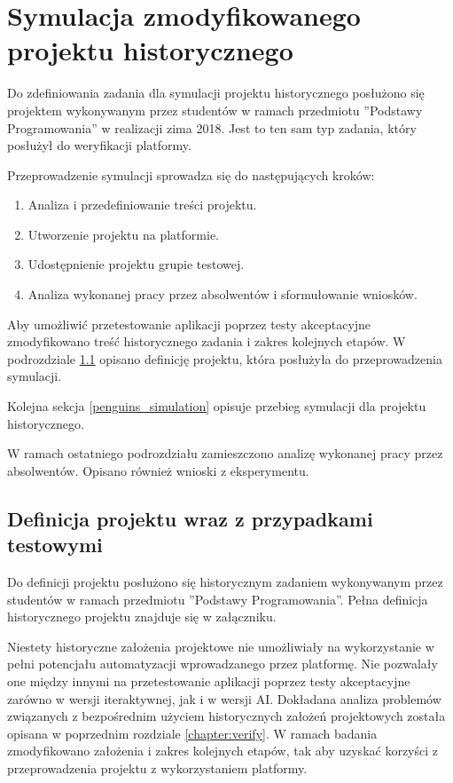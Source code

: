 \section{Symulacja zmodyfikowanego projektu historycznego}
\label{research_penguins}

Do zdefiniowania zadania dla symulacji projektu historycznego posłużono się projektem wykonywanym przez studentów w ramach przedmiotu ”Podstawy Programowania” w realizacji zima 2018.
Jest to ten sam typ zadania, który posłużył do weryfikacji platformy.

Przeprowadzenie symulacji sprowadza się do następujących kroków:
\begin{enumerate}
    \item Analiza i przedefiniowanie treści projektu.
    \item Utworzenie projektu na platformie.
    \item Udostępnienie projektu grupie testowej.
    \item Analiza wykonanej pracy przez absolwentów i sformułowanie wniosków.
\end{enumerate}

Aby umożliwić przetestowanie aplikacji poprzez testy akceptacyjne zmodyfikowano treść historycznego zadania i zakres kolejnych etapów.
W podrozdziale \ref{penguins_project_definition} opisano definicję projektu, która posłużyła do przeprowadzenia symulacji.

Kolejna sekcja \ref{penguins_simulation} opisuje przebieg symulacji dla projektu historycznego.

W ramach ostatniego podrozdziału zamieszczono analizę wykonanej pracy przez absolwentów.
Opisano również wnioski z eksperymentu.


\subsection{Definicja projektu wraz z przypadkami testowymi}
\label{penguins_project_definition}

Do definicji projektu posłużono się historycznym zadaniem wykonywanym przez studentów w ramach przedmiotu ”Podstawy Programowania”.
Pełna definicja historycznego projektu znajduje się w załączniku.

Niestety historyczne założenia projektowe nie umożliwiały na wykorzystanie w pełni potencjału automatyzacji wprowadzanego przez platformę.
Nie pozwalały one między innymi na przetestowanie aplikacji poprzez testy akceptacyjne zarówno w wersji iteraktywnej, jak i w wersji AI.
Dokładana analiza problemów związanych z bezpośrednim użyciem historycznych założeń projektowych została opisana w poprzednim rozdziale \ref{chapter:verify}.
W ramach badania zmodyfikowano założenia i zakres kolejnych etapów, tak aby uzyskać korzyści z przeprowadzenia projektu z wykorzystaniem platformy.

